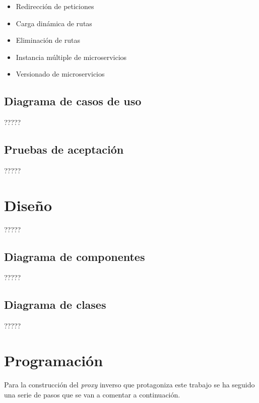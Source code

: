\documentclass[11pt,spanish,listoffigures]{tfgetsinf}
\begin{document}
\begin{itemize}

\item Redirección de peticiones
\item Carga dinámica de rutas
\item Eliminación de rutas
\item Instancia múltiple de microservicios
\item Versionado de microservicios

\end{itemize}

\subsection{Diagrama de casos de uso}

?????

\subsection{Pruebas de aceptación}

?????


\section{Diseño}

?????

\subsection{Diagrama de componentes}

?????

\subsection{Diagrama de clases}

?????


\section{Programación}

Para la construcción del \emph{proxy} inverso que protagoniza este trabajo se ha seguido una serie de pasos que se van a comentar a continuación.
\end{document}
